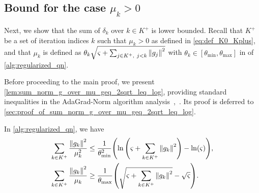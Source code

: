 \documentclass[journal]{subfiles}
\begin{document}
\subsection{Bound for the case \texorpdfstring{$\mu_k > 0$}{mu k > 0}}

Next, we show that the sum of $\delta_{k}$ over $k \in K^+$ is lower bounded.
Recall that $K^+$ be a set of iteration indices $k$ such that $\mu_k > 0$ as defined in \cref{eq:def_K0_Kplus}, and that $\mu_k$ is defined as $\theta_k \sqrt{\varsigma + \sum_{j \in K^+,\ j < k} \norm{g_{j}}^2}$ with $\theta_k \in [\theta_{\min}, \theta_{\max}]$ in  of \cref{alg:regularized_qn}.

Before proceeding to the main proof, we present \cref{lem:sum_norm_g_over_mu_geq_2sqrt_leq_log}, providing standard inequalities in the AdaGrad-Norm algorithm analysis~\citep[Lemma~3.2]{wardAdaGradStepsizesSharp2020},~\citep[Lemma~3.1]{Gratton08022024}.
Its proof is deferred to \cref{sec:proof_of_sum_norm_g_over_mu_geq_2sqrt_leq_log}.
\begin{lemma}\label{lem:sum_norm_g_over_mu_geq_2sqrt_leq_log}
    In \cref{alg:regularized_qn}, we have
    \begin{align*}
        \sum_{{k} \in K^+}\frac{\norm{g_{k}}^2}{\mu_{k}^2}
         & \le \frac{1}{\theta_{\min}^2} \qty(\ln\qty(\varsigma+\sum_{ k \in K^+} \norm{g_{k}}^2) - \ln(\varsigma)),  \\
        \sum_{{k} \in K^+} \frac{\norm{g_{k}}^2}{\mu_{k}}
         & \ge \frac{1}{\theta_{\max}} \qty(\sqrt{\varsigma + \sum_{{k} \in K^+} \norm{g_{k}}^2} - \sqrt{\varsigma}).
    \end{align*}
\end{lemma}
\end{document}
